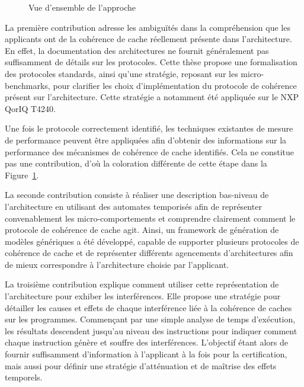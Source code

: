 \begin{figure}[hbt]
\iffalse
\begin{subfigure}[t]{\textwidth}
\centering

\end{subfigure}
\begin{subfigure}[t]{\textwidth}
\vspace{2em}
\centering

\end{subfigure}
\begin{subfigure}[t]{\textwidth}
\vspace{4em}
\centering

\end{subfigure}
\fi
\centering

\caption{Vue d'ensemble de l'approche}
\label{fr:fig:second_intro:approach}
\end{figure}

La première contribution adresse les ambiguïtés dans la compréhension que les applicants
ont de la cohérence de cache réellement présente dans l'architecture.
En effet, la documentation des architectures
ne fournit généralement pas suffisamment de détails sur les protocoles.
Cette thèse propose une formalisation des protocoles standards,
ainsi qu'une stratégie, reposant sur les micro-benchmarks,
pour clarifier les choix d'implémentation du protocole de
cohérence présent sur l'architecture. Cette stratégie a notamment été appliquée sur le NXP
QorIQ T4240.

Une fois le protocole correctement identifié, les techniques existantes de
mesure de performance peuvent être appliquées afin d'obtenir des
informations sur la performance des mécanismes de cohérence de cache identifiés.
Cela ne constitue pas une contribution, d'où la coloration différente de cette
étape dans la Figure~\ref{fr:fig:second_intro:approach}.

La seconde
contribution consiste à réaliser une description bas-niveau de l'architecture
en utilisant des automates temporisés afin de représenter convenablement les
micro-comportements et comprendre clairement comment le protocole de cohérence
de cache agit. Ainsi, un framework de génération de modèles génériques a été
développé, capable de supporter plusieurs protocoles de cohérence de cache et de représenter différents agencements d'architectures
afin de mieux correspondre à l'architecture choisie par l'applicant.

La
troisième contribution explique comment utiliser cette représentation de
l'architecture pour exhiber les interférences. Elle propose une stratégie pour
détailler les causes et effets de chaque interférence liée à la cohérence de caches
sur les programmes.
Commençant par une simple analyse de temps d'exécution, les résultats
descendent jusqu'au niveau des instructions pour indiquer comment chaque
instruction génère et souffre des interférences. L'objectif étant alors de
fournir suffisamment d'information à l'applicant à la fois pour la certification, mais aussi pour définir une
stratégie d'atténuation et de maîtrise des effets temporels.

